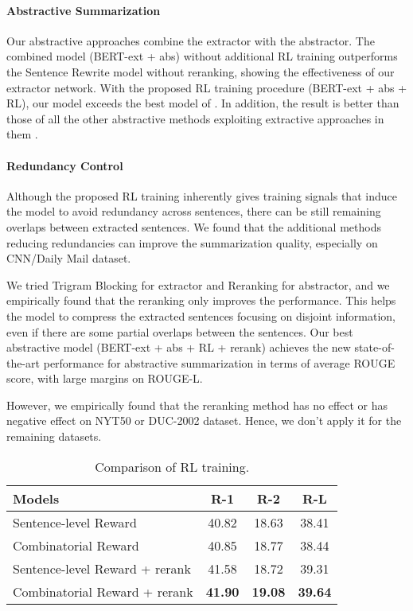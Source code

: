 \documentclass[11pt,a4paper]{article}
\begin{document}
\paragraph{Abstractive Summarization}
Our abstractive approaches combine the extractor with the abstractor.
The combined model (BERT-ext + abs) without additional RL training
outperforms the Sentence Rewrite model
\cite{chen-bansal-2018-fast} without reranking, showing the
effectiveness of our extractor network.
With the proposed RL training procedure (BERT-ext + abs + RL),
our model exceeds the best model of \citet{chen-bansal-2018-fast}.
In addition, the result is better than those of all the other abstractive methods
exploiting extractive approaches in them
\cite{hsu-etal-2018-unified, chen-bansal-2018-fast, gehrmann-etal-2018-bottom}.


\paragraph{Redundancy Control}
Although the proposed RL training inherently gives training signals
that induce the model to avoid redundancy across sentences,
there can be still remaining overlaps between extracted sentences.
We found that the additional methods reducing redundancies can
improve the summarization quality, especially on CNN/Daily Mail dataset.

We tried Trigram Blocking \cite{liu2019fine} for extractor and
Reranking \cite{chen-bansal-2018-fast} for abstractor, and we
empirically found that the reranking only improves the performance.
This helps the model to compress the extracted sentences
focusing on disjoint information, even if there are some partial
overlaps between the sentences.
Our best abstractive model (BERT-ext + abs + RL + rerank) achieves
the new state-of-the-art performance for abstractive summarization
in terms of average ROUGE score, with large margins on ROUGE-L.

However, we empirically found that the reranking method
has no effect or has negative effect on NYT50 or DUC-2002 dataset.
Hence, we don't apply it for the remaining datasets.

\begin{table}
\begin{center}
\begin{adjustbox}{max width=0.95\columnwidth}
\begin{tabular}{l|ccc}
    \hline 
    \bf Models & \bf R-1 & \bf R-2 & \bf R-L \\ 
    \hline
    Sentence-level Reward & 40.82 & 18.63 & 38.41 \\
    Combinatorial Reward & 40.85 & 18.77 & 38.44 \\
    \hline
    Sentence-level Reward + rerank & 41.58 & 18.72 & 39.31 \\
    Combinatorial Reward + rerank & \bf 41.90 & \bf 19.08 & \bf 39.64 \\
    \hline
\end{tabular}
\end{adjustbox}
\end{center}
\caption{\label{table:ablation} Comparison of RL training.}
\end{table}
\end{document}

